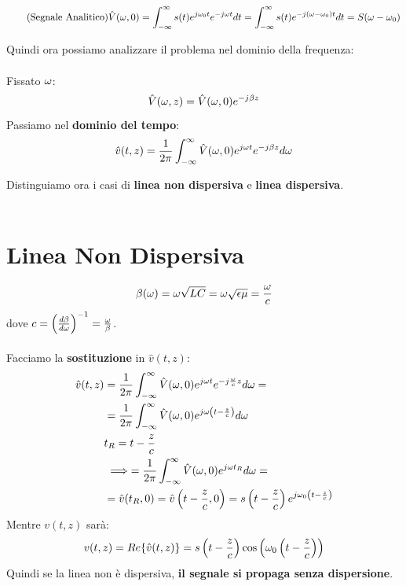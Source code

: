 \begin{equation*}
    \tag{Segnale Analitico}
    \hat{V}(\omega, 0) = \int_{- \infty}^{\infty} s(t) e^{j\omega_0 t} e^{-j\omega t} dt = \int_{- \infty}^{\infty} s(t) e^{-j(\omega -\omega_0)t}dt = S(\omega - \omega_0)
\end{equation*}

Quindi ora possiamo analizzare il problema nel dominio della frequenza:\\ \\
Fissato $\omega$:
\begin{equation*}
    \hat{V}(\omega, z) = \hat{V} (\omega, 0) e^{-j \beta z}
\end{equation*}
Passiamo nel \textbf{dominio del tempo}:
\begin{equation*}
    \hat{v}(t, z) = \frac{1}{2\pi} \int_{- \infty}^{\infty}\hat{V}(\omega, 0) e^{j \omega t} e^{-j\beta z} d\omega
 \end{equation*}

Distinguiamo ora i casi di \textbf{linea non dispersiva} e \textbf{linea dispersiva}.\\ \\
\section{Linea Non Dispersiva}
\begin{equation*}
    \beta(\omega) = \omega \sqrt{LC} = \omega \sqrt{\epsilon \mu} = \frac{\omega}{c}
\end{equation*}
dove $c = {\left(\frac{d\beta}{d\omega}\right)}^{-1} = \frac{\omega}{\beta}$.\\ \\
Facciamo la \textbf{sostituzione} in $\hat{v}(t,z)$:
\begin{equation*}
    \begin{aligned}
    \hat{v}(t,z) &= \frac{1}{2\pi} \int_{- \infty}^{\infty}\hat{V}(\omega, 0) e^{j\omega t} e^{-j \frac{\omega}{c}z} d\omega = \\
    &= \frac{1}{2\pi} \int_{- \infty}^{\infty}\hat{V}(\omega, 0) e^{j\omega \left( t - \frac{z}{c}\right)} d\omega \\
    & t_R = t - \frac{z}{c} \\
    &\implies = \frac{1}{2\pi} \int_{- \infty}^{\infty}\hat{V}(\omega, 0)e^{j\omega t_R}  d\omega = \\
    &= \hat{v}(t_R, 0) = \hat{v}\left(t - \frac{z}{c}, 0\right) = s\left(t - \frac{z}{c}\right) e^{j \omega_0 \left(t - \frac{z}{c}\right)}
    \end{aligned}
\end{equation*}
Mentre $v(t,z)$ sarà:
\begin{equation*}
    v(t,z) = Re\{\hat{v}(t,z)\} = s\left(t - \frac{z}{c}\right) \cos\left(\omega_0 \left(t - \frac{z}{c}\right)\right)
\end{equation*}
Quindi se la linea non è dispersiva,\textbf{ il segnale si propaga senza dispersione}.

